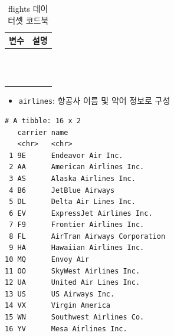 \documentclass[
  11pt,
]{krantz}
\providecommand{\tightlist}{%
  \setlength{\itemsep}{0pt}\setlength{\parskip}{0pt}}
\begin{document}
\normalsize

\footnotesize

\begin{table}[H]

\caption{\label{tab:unnamed-chunk-46}flights 데이터셋 코드북}
\centering
\fontsize{11}{13}\selectfont
\begin{tabu} to 
\toprule
변수 & 설명\\
\midrule
{}   & \\
 & \\
   & \\
 & \\
   & \\
\addlinespace
{} & \\
   & \\
 & \\
   & \\
 & \\
\addlinespace
{}   & \\
 & \\
\bottomrule
\end{tabu}
\end{table}

\normalsize

\begin{itemize}
\tightlist
\item
  \texttt{airlines}: 항공사 이름 및 약어 정보로 구성
\end{itemize}

\footnotesize

\begin{verbatim}
# A tibble: 16 x 2
   carrier name                       
   <chr>   <chr>                      
 1 9E      Endeavor Air Inc.          
 2 AA      American Airlines Inc.     
 3 AS      Alaska Airlines Inc.       
 4 B6      JetBlue Airways            
 5 DL      Delta Air Lines Inc.       
 6 EV      ExpressJet Airlines Inc.   
 7 F9      Frontier Airlines Inc.     
 8 FL      AirTran Airways Corporation
 9 HA      Hawaiian Airlines Inc.     
10 MQ      Envoy Air                  
11 OO      SkyWest Airlines Inc.      
12 UA      United Air Lines Inc.      
13 US      US Airways Inc.            
14 VX      Virgin America             
15 WN      Southwest Airlines Co.     
16 YV      Mesa Airlines Inc.         
\end{verbatim}
\end{document}
